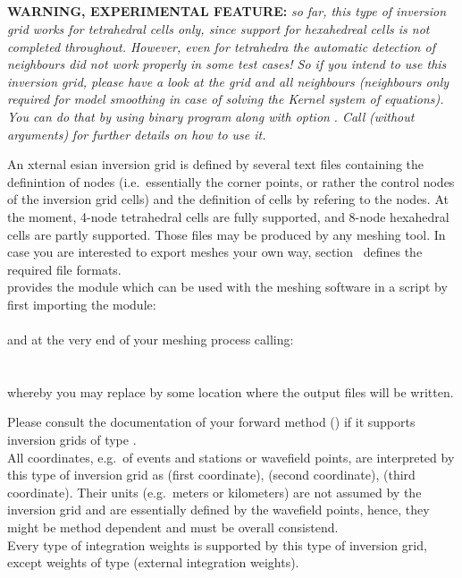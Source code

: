 \subsection{} \label{basic_steps,sec:invgrid,sub:ecart}
%
{\bf WARNING, EXPERIMENTAL FEATURE:} \emph{so far, this type of inversion grid works for tetrahedral cells only,
since support for hexahedreal cells is not completed throughout. However, even for tetrahedra the automatic detection 
of neighbours did not work properly in some test cases! So if you intend to use this inversion grid, please have a look 
at the grid and all neighbours (neighbours only required for model smoothing in case of solving the Kernel system of equations).
You can do that by using binary program}  \emph{along with option}  \emph{. Call} 
 \emph{(without arguments)}  \emph{for further details on how to use it.}

An xternal esian inversion grid is defined by several text files containing the definintion 
of nodes (i.e.\  essentially the corner points, or rather the control nodes of the inversion grid cells) and the 
definition of cells by refering to the nodes. At the moment, 4-node tetrahedral cells are fully supported, and 8-node 
hexahedral cells are partly supported. 
Those files may be produced by any meshing tool. In case you are interested to export meshes your own way, 
section~ defines the required file formats.\\
\ASKI provides the  module  which can be used with the 
meshing software  in a  script by first importing the module:\\
\\
and at the very end of your meshing process calling:\\
\\
\\
whereby you may replace  by some location where the output files will be written.

Please consult the documentation of your forward method () if it supports
inversion grids of type . \\
All coordinates, e.g.\ of events and stations or wavefield points, are interpreted by this type of inversion grid as
 (first coordinate),  (second coordinate),  (third coordinate). Their
units (e.g.\ meters or kilometers) are not assumed by the inversion grid and are essentially defined by the wavefield
points, hence, they might be method dependent and must be overall consistend.\\
Every type of integration weights is supported by this type of inversion grid, except weights of type 
 (external integration weights).

